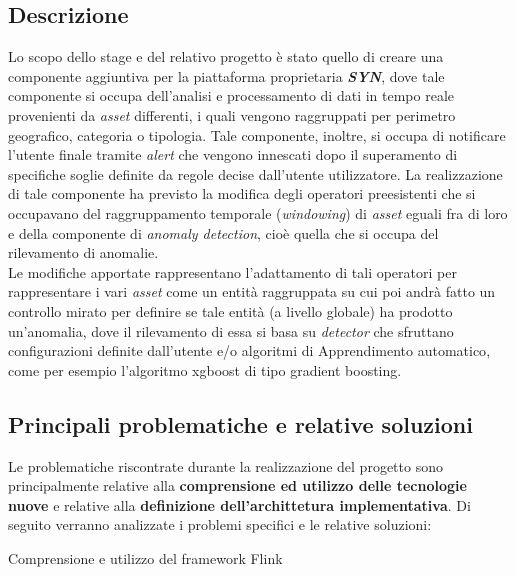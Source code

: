 \subsection{Descrizione}

Lo scopo dello stage e del relativo progetto è stato quello di creare una componente aggiuntiva per la piattaforma proprietaria \textbf{\textit{SYN}}, dove tale componente si occupa dell'analisi e processamento di dati in tempo reale provenienti da \textit{asset} differenti, i quali vengono raggruppati per perimetro geografico, categoria o tipologia. Tale componente, inoltre,
si occupa di notificare l'utente finale tramite \textit{alert} che vengono innescati dopo il superamento di specifiche soglie definite da regole decise dall'utente utilizzatore.
La realizzazione di tale componente ha previsto la modifica degli operatori preesistenti che si occupavano del raggruppamento temporale (\textit{windowing}) di \textit{asset} eguali fra di loro e della componente di \textit{anomaly detection}, cioè quella che si occupa del rilevamento di anomalie.\\
Le modifiche apportate rappresentano l'adattamento di tali operatori per rappresentare i vari \textit{asset} come un entità raggruppata su cui poi andrà fatto un controllo mirato per definire se tale entità (a livello globale) ha prodotto un'anomalia, dove il rilevamento di essa si basa su \textit{detector} che sfruttano configurazioni definite dall'utente e/o algoritmi di \gls{Apprendimento automatico}, come per esempio l'algoritmo \gls{xgboost} di tipo \gls{gradient boosting}.


\subsection{Principali problematiche e relative soluzioni}
Le problematiche riscontrate durante la realizzazione del progetto sono principalmente relative alla \textbf{comprensione ed utilizzo delle tecnologie nuove} e relative alla \textbf{definizione dell'archittetura implementativa}. Di seguito verranno analizzate i problemi specifici e le relative soluzioni:\\

\begin{risk}{Comprensione e utilizzo del framework Flink}
    \label{risk:flinkImport}
\end{risk}

